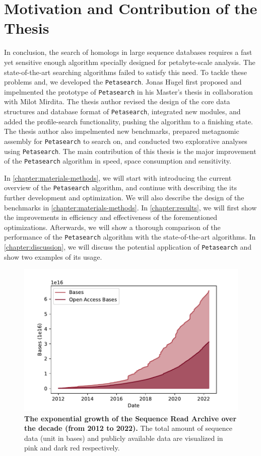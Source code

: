 \section{Motivation and Contribution of the Thesis}

In conclusion, the search of homologs in large sequence databases requires a fast yet sensitive enough algorithm specially designed for petabyte-scale analysis.
The state-of-the-art searching algorithms failed to satisfy this need.
To tackle these problems and, we developed the \texttt{Petasearch}.
Jonas H{$\ddot{u}$}gel first proposed and impelmented the prototype of \texttt{Petasearch} in his Master's thesis in collaboration with Milot Mirdita.
The thesis author revised the design of the core data structures and database format of \texttt{Petasearch}, integrated new modules, and added the profile-search functionality, pushing the algorithm to a finishing state.
The thesis author also impelmented new benchmarks, prepared metagnomic assembly for \texttt{Petasearch} to search on, and conducted two explorative analyses using \texttt{Petasearch}.
The main contribution of this thesis is the major improvement of the \texttt{Petasearch} algorithm in speed, space consumption and sensitivity.

In \cref{chapter:materials-methods}, we will start with introducing the current overview of the \texttt{Petasearch} algorithm, and continue with describing the its further development and optimization.
We will also describe the design of the benchmarks in \cref{chapter:materials-methods}.
In \cref{chapter:results}, we will first show the improvements in efficiency and effectiveness of the forementioned optimizations.
Afterwards, we will show a thorough comparison of the performance of the \texttt{Petasearch} algorithm with the state-of-the-art algorithms.
In \cref{chapter:discussion}, we will discuss the potential application of \texttt{Petasearch} and show two examples of its usage.

\begin{figure}[htbp]
  \centering
  \includegraphics[width=\textwidth]{images/sra_stat.pdf}
  \caption{\textbf{The exponential growth of the Sequence Read Archive over the decade (from 2012 to 2022).}
The total amount of sequence data (unit in bases) and publicly available data are visualized in pink and dark red respectively.}
  \label{fig:sra_stat}
\end{figure}
\pagebreak
